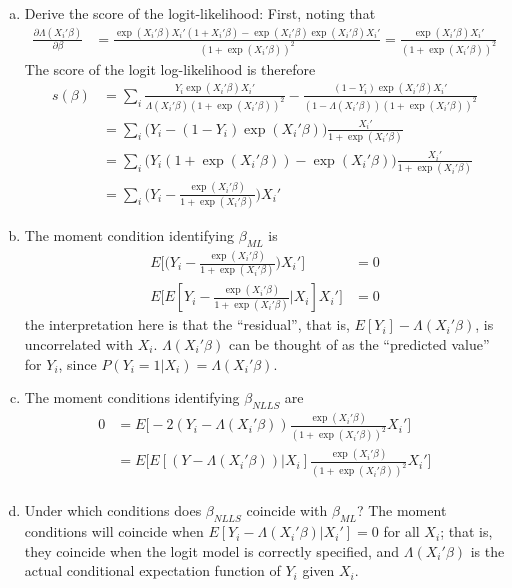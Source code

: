 \documentclass[11pt]{article}
\begin{document}
\begin{enumerate}[a)]

	\item Derive the score of the logit-likelihood:
	First, noting that
	\begin{align*}
		\frac{\partial \Lambda(X_i'\beta)}{\partial \beta} &= \frac{\exp(X_i' \beta)X_i'(1 + X_i'\beta) - \exp(X_i'\beta) \exp(X_i'\beta) X_i'}{(1+\exp(X_i'\beta))^2} = \frac{\exp(X_i'\beta)X_i'}{(1 + \exp(X_i'\beta))^2}
	\end{align*}
	The score of the logit log-likelihood is therefore
	\begin{align*}
		s(\beta) &= \sum_i \frac{Y_i \exp(X_i'\beta)X_i' }{\Lambda(X_i'\beta)(1 + \exp(X_i'\beta))^2} -
			\frac{(1 - Y_i)\exp(X_i'\beta)X_i'}{(1 - \Lambda(X_i'\beta))(1 + \exp(X_i'\beta))^2} \\
		&= \sum_i \Big( Y_i - (1 - Y_i)\exp(X_i'\beta) \Big) \frac{X_i'}{1 + \exp(X_i'\beta)}\\
		&= \sum_i \Big( Y_i(1 + \exp(X_i'\beta)) - \exp(X_i'\beta) \Big) \frac{X_i'}{1 + \exp(X_i'\beta)} \\
		&= \sum_i \Big( Y_i - \frac{\exp(X_i'\beta)}{1 + \exp(X_i'\beta)} \Big) X_i'
	\end{align*}
	
	\item The moment condition identifying $\beta_{ML}$ is
	\begin{align*}
		E \bigg[ \Big( Y_i - \frac{\exp(X_i'\beta)}{1 + \exp(X_i'\beta)}\Big) X_i' \bigg] &= 0 \\
		E \bigg[ E[Y_i - \frac{\exp(X_i'\beta)}{1 + \exp(X_i'\beta)}| X_i] X_i' \bigg] &= 0
	\end{align*}
	the interpretation here is that the ``residual'', that is, $E[Y_i] - \Lambda(X_i'\beta)$, is uncorrelated with $X_i$. $\Lambda(X_i'\beta)$ can be thought of as the ``predicted value'' for $Y_i$, since $P(Y_i = 1 | X_i) = \Lambda(X_i'\beta)$.
	
	\item The moment conditions identifying $\beta_{NLLS}$ are
	\begin{align*}
		0 &= E \bigg[ -2 (Y_i - \Lambda(X_i'\beta)) \frac{\exp(X_i'\beta)}{(1 + \exp(X_i'\beta))^2} X_i' \bigg] \\
		&= E \bigg[ E[(Y - \Lambda(X_i'\beta)) | X_i] \frac{\exp(X_i'\beta)}{(1 + \exp(X_i'\beta))^2} X_i' \bigg] \\
	\end{align*}

	\item Under which conditions does $\beta_{NLLS}$ coincide with $\beta_{ML}$? The moment conditions will coincide when $E[Y_i - \Lambda(X_i'\beta) | X_i'] = 0$ for all $X_i$; that is, they coincide when the logit model is correctly specified, and $\Lambda(X_i'\beta)$ is the actual conditional expectation function of $Y_i$ given $X_i$.

\end{enumerate}
\end{document}
